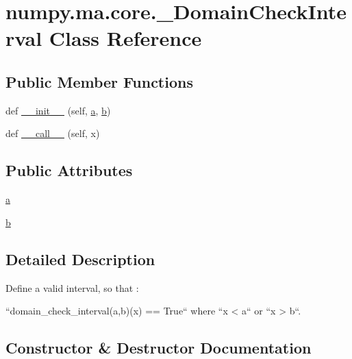 \hypertarget{classnumpy_1_1ma_1_1core_1_1__DomainCheckInterval}{}\section{numpy.\+ma.\+core.\+\_\+\+Domain\+Check\+Interval Class Reference}
\label{classnumpy_1_1ma_1_1core_1_1__DomainCheckInterval}
\subsection*{Public Member Functions}
\begin{DoxyCompactItemize}
\item 
def \hyperlink{classnumpy_1_1ma_1_1core_1_1__DomainCheckInterval_a5963cfa6bab4ffd7eeb84b76cb89276e}{\+\_\+\+\_\+init\+\_\+\+\_\+} (self, \hyperlink{classnumpy_1_1ma_1_1core_1_1__DomainCheckInterval_a62176b8d30bf224a4a4614acae0145f1}{a}, \hyperlink{classnumpy_1_1ma_1_1core_1_1__DomainCheckInterval_ab4d56992d7a36ca81ddfb5439ad023db}{b})
\item 
def \hyperlink{classnumpy_1_1ma_1_1core_1_1__DomainCheckInterval_a6b35a1b147100c3a429bce604966fae2}{\+\_\+\+\_\+call\+\_\+\+\_\+} (self, x)
\end{DoxyCompactItemize}
\subsection*{Public Attributes}
\begin{DoxyCompactItemize}
\item 
\hyperlink{classnumpy_1_1ma_1_1core_1_1__DomainCheckInterval_a62176b8d30bf224a4a4614acae0145f1}{a}
\item 
\hyperlink{classnumpy_1_1ma_1_1core_1_1__DomainCheckInterval_ab4d56992d7a36ca81ddfb5439ad023db}{b}
\end{DoxyCompactItemize}


\subsection{Detailed Description}
\begin{DoxyVerb}Define a valid interval, so that :

``domain_check_interval(a,b)(x) == True`` where
``x < a`` or ``x > b``.\end{DoxyVerb}
 

\subsection{Constructor \& Destructor Documentation}
\mbox{\label{classnumpy_1_1ma_1_1core_1_1__DomainCheckInterval_a5963cfa6bab4ffd7eeb84b76cb89276e}} 
